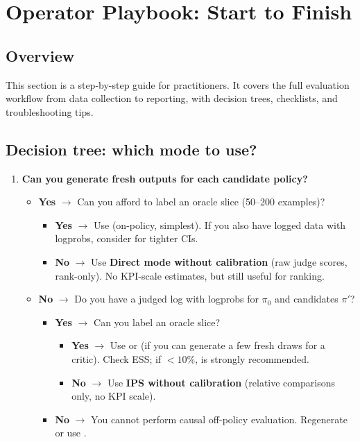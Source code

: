 \section{Operator Playbook: Start to Finish}

\subsection{Overview}

This section is a step-by-step guide for practitioners. It covers the full evaluation workflow from data collection to reporting, with decision trees, checklists, and troubleshooting tips.

\subsection{Decision tree: which mode to use?}

\begin{enumerate}
\item \textbf{Can you generate fresh outputs for each candidate policy?}
   \begin{itemize}
   \item \textbf{Yes} $\to$ Can you afford to label an oracle slice (50--200 examples)?
      \begin{itemize}
      \item \textbf{Yes} $\to$ Use \textbf{\dm} (on-policy, simplest). If you also have logged data with logprobs, consider \textbf{\dr} for tighter CIs.
      \item \textbf{No} $\to$ Use \textbf{Direct mode without calibration} (raw judge scores, rank-only). No KPI-scale estimates, but still useful for ranking.
      \end{itemize}
   \item \textbf{No} $\to$ Do you have a judged log with logprobs for $\pi_0$ and candidates $\pi'$?
      \begin{itemize}
      \item \textbf{Yes} $\to$ Can you label an oracle slice?
         \begin{itemize}
         \item \textbf{Yes} $\to$ Use \textbf{\ips} or \textbf{\dr} (if you can generate a few fresh draws for a critic). Check ESS; if $< 10\%$, \dr{} is strongly recommended.
         \item \textbf{No} $\to$ Use \textbf{IPS without calibration} (relative comparisons only, no KPI scale).
         \end{itemize}
      \item \textbf{No} $\to$ You cannot perform causal off-policy evaluation. Regenerate or use \dm.
      \end{itemize}
   \end{itemize}
\end{enumerate}

